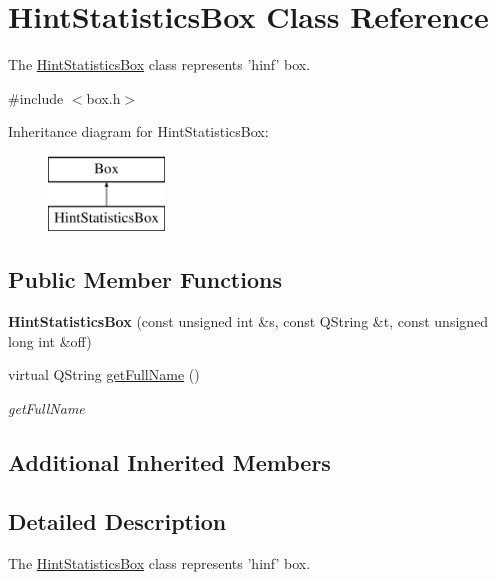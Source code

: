\hypertarget{class_hint_statistics_box}{\section{Hint\-Statistics\-Box Class Reference}
\label{class_hint_statistics_box}
}


The \hyperlink{class_hint_statistics_box}{Hint\-Statistics\-Box} class represents 'hinf' box.  




{\ttfamily \#include $<$box.\-h$>$}

Inheritance diagram for Hint\-Statistics\-Box\-:\begin{figure}[H]
\begin{center}
\leavevmode
\includegraphics[height=2.000000cm]{class_hint_statistics_box}
\end{center}
\end{figure}
\subsection*{Public Member Functions}
\begin{DoxyCompactItemize}
\item 
\hypertarget{class_hint_statistics_box_a31d6a7f3945b501f5e77b0c735ddfbe2}{{\bfseries Hint\-Statistics\-Box} (const unsigned int \&s, const Q\-String \&t, const unsigned long int \&off)}\label{class_hint_statistics_box_a31d6a7f3945b501f5e77b0c735ddfbe2}

\item 
virtual Q\-String \hyperlink{class_hint_statistics_box_acec0896d250145c53576fb9f079136ca}{get\-Full\-Name} ()
\begin{DoxyCompactList}\small\item\em get\-Full\-Name \end{DoxyCompactList}\end{DoxyCompactItemize}
\subsection*{Additional Inherited Members}


\subsection{Detailed Description}
The \hyperlink{class_hint_statistics_box}{Hint\-Statistics\-Box} class represents 'hinf' box. 

